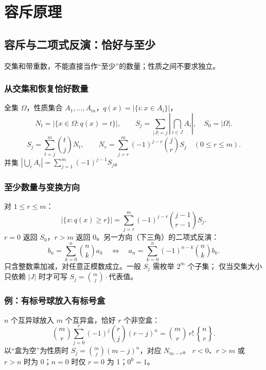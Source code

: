 \newpage

\section{容斥原理}

\subsection{容斥与二项式反演：恰好与至少}\label{knowledge-inclusion-exact}
交集和带重数，不能直接当作“至少”的数量；性质之间不要求独立。

\subsubsection{从交集和恢复恰好数量}
全集 $\Omega$，性质集合 $A_1,\ldots,A_m$，$q(x)=|\{i:x\in A_i\}|$，
\[
N_t=|\{x\in\Omega:q(x)=t\}|,\qquad
S_j=\sum_{|J|=j}\left|\bigcap_{i\in J}A_i\right|,\quad S_0=|\Omega|.
\]
\[
\boxed{S_j=\sum_{t=j}^m\binom tjN_t,\qquad
N_r=\sum_{j=r}^m(-1)^{j-r}\binom jrS_j\quad(0\le r\le m).}
\]
并集 $|\bigcup_iA_i|=\sum_{j=1}^m(-1)^{j-1}S_j$。

\subsubsection{至少数量与变换方向}
对 $1\le r\le m$：
\[
\boxed{|\{x:q(x)\ge r\}|=
\sum_{j=r}^m(-1)^{j-r}\binom{j-1}{r-1}S_j.}
\]
$r=0$ 返回 $S_0$，$r>m$ 返回 0。另一方向（下三角）的二项式反演：
\[
b_n=\sum_{k=0}^n\binom nk a_k
\quad\Longleftrightarrow\quad
 a_n=\sum_{k=0}^n(-1)^{n-k}\binom nk b_k.
\]
只含整数乘加减，对任意正模数成立。一般 $S_j$ 需枚举 $2^m$ 个子集；
仅当交集大小只依赖 $|J|$ 时才可写 $S_j=\binom mj\cdot$代表值。

\subsubsection{例：有标号球放入有标号盒}
$n$ 个互异球放入 $m$ 个互异盒，恰好 $r$ 个非空盒：
\[
\boxed{\binom mr\sum_{j=0}^r(-1)^j\binom rj(r-j)^n
=\binom mr\,r!\,\genfrac{\{}{\}}{0pt}{}{n}{r}.}
\]
以“盒为空”为性质时 $S_j=\binom mj(m-j)^n$，对应 $N_{m-r}$。
$r<0$、$r>m$ 或 $r>n$ 时为 0；$n=0$ 时仅 $r=0$ 为 1；$0^0=1$。

